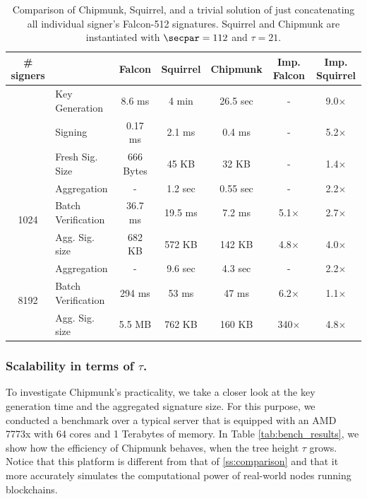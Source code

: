 \begin{table}\centering
  \begin{tabular}{clccccc}
    \# signers      &                 & Falcon      & Squirrel  & Chipmunk  & Imp. Falcon & Imp. Squirrel \\\toprule
    \multirow{2}{*}{} 
                    & Key Generation  & 8.6 ms      & 4 min     & 26.5 sec  &     -       & 9.0$\times$ \\%
                    & Signing         & 0.17 ms     & 2.1 ms    & 0.4 ms    &     -       & 5.2$\times$ \\%
                    &Fresh Sig. Size  & 666 Bytes   & 45 KB     & 32 KB     &     -       & 1.4$\times$ \\\midrule
    \multirow{3}{*}{1024}                
                    &Aggregation      & -           & 1.2 sec   & 0.55 sec  &     -       & 2.2$\times$ \\%
                    &Batch Verification    
                                      & 36.7 ms     & 19.5 ms   & 7.2 ms    & 5.1$\times$ & 2.7$\times$ \\%
                    
                    &Agg. Sig. size   & 682 KB      & 572 KB    & 142 KB    & 4.8$\times$ & 4.0$\times$ \\\midrule
    \multirow{3}{*}{8192}                
                    &Aggregation      & -           & 9.6 sec   & 4.3 sec   &     -       & 2.2$\times$ \\%
                    &Batch Verification    
                                      & 294 ms      & 53  ms    &  47 ms    & 6.2$\times$ & 1.1$\times$ \\%
                    &Agg. Sig. size   & 5.5 MB      & 762 KB    & 160 KB    & 340$\times$ & 4.8$\times$\\ \bottomrule
  \end{tabular}
  \caption{Comparison of Chipmunk, Squirrel, and a trivial solution of just concatenating all individual signer's Falcon-512 signatures. Squirrel and Chipmunk are instantiated with $\secpar = 112$ and $\tau=21$. }\label{tab:benchmarksizes}
\end{table}

\subsubsection{Scalability in terms of $\tau$.}
To investigate Chipmunk's practicality, we take a closer look at the key generation time and the aggregated signature size.
For this purpose, we conducted a benchmark over a typical server that is equipped with an AMD 7773x with 64 cores and 1 Terabytes of memory.
In Table \ref{tab:bench_results}, we show how the efficiency of Chipmunk behaves, when the tree height $\tau$ grows.
Notice that this platform is different from that of \autoref{ss:comparison} and that it more accurately simulates the computational power of real-world nodes running blockchains.

